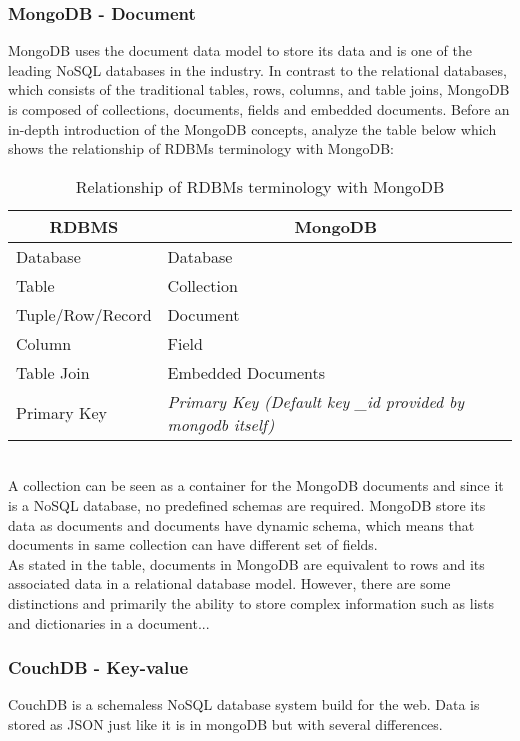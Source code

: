 \subsubsection{MongoDB - Document}
MongoDB uses the document data model to store its data and is one of the leading NoSQL databases in the industry. In contrast to the relational databases, which consists of the traditional tables, rows, columns, and table joins, MongoDB is composed of collections, documents, fields and embedded documents. Before an in-depth introduction of the MongoDB concepts, analyze the table below which shows the relationship of RDBMs terminology with MongoDB:\\
\begin{table}[h] %
\centering
\caption{Relationship of RDBMs terminology with MongoDB}
\label{my-label}
\begin{tabular}{|l|l|}
\hline
\multicolumn{1}{|c|}{\textbf{RDBMS}} & \multicolumn{1}{c|}{\textbf{MongoDB}} \\ \hline
Database                             & Database \\ \hline
Table                                & Collection \\ \hline
Tuple/Row/Record                     & Document \\ \hline
Column                               & Field \\ \hline
Table Join                           & Embedded Documents \\ \hline
Primary Key                          & \textit{Primary Key (Default key \_id provided by mongodb itself)} \\ \hline
\end{tabular}
\end{table} \\
A collection can be seen as a container for the MongoDB documents and since it is a NoSQL database, no predefined schemas are required. MongoDB store its data as documents and documents have dynamic schema, which means that documents in same collection can have different set of fields.\\ As stated in the table, documents in MongoDB are equivalent to rows and its associated data in a relational database model. However, there are some distinctions and primarily the ability to store complex information such as lists and dictionaries in a document...

\subsubsection{CouchDB - Key-value}
CouchDB is a schemaless NoSQL database system build for the web. Data is stored as JSON just like it is in mongoDB but with several differences. 
\bigskip

